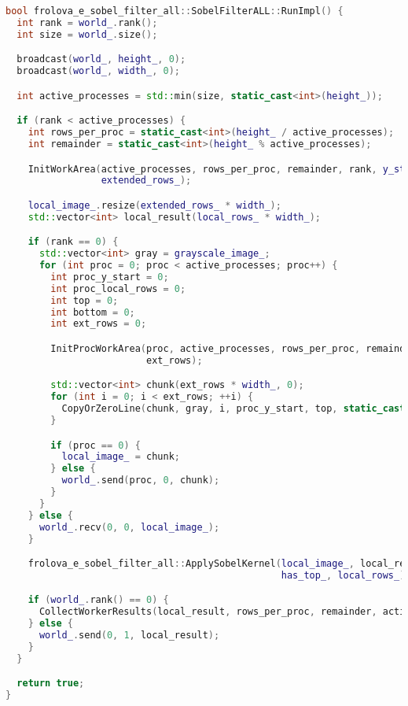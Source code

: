 \documentclass{report}
\begin{document}
\begin{lstlisting}[language=C++,caption={MPI + TBB Version}]
bool frolova_e_sobel_filter_all::SobelFilterALL::RunImpl() {
  int rank = world_.rank();
  int size = world_.size();

  broadcast(world_, height_, 0);
  broadcast(world_, width_, 0);

  int active_processes = std::min(size, static_cast<int>(height_));

  if (rank < active_processes) {
    int rows_per_proc = static_cast<int>(height_ / active_processes);
    int remainder = static_cast<int>(height_ % active_processes);

    InitWorkArea(active_processes, rows_per_proc, remainder, rank, y_start_, local_rows_, has_top_, has_bottom_,
                 extended_rows_);

    local_image_.resize(extended_rows_ * width_);
    std::vector<int> local_result(local_rows_ * width_);

    if (rank == 0) {
      std::vector<int> gray = grayscale_image_;
      for (int proc = 0; proc < active_processes; proc++) {
        int proc_y_start = 0;
        int proc_local_rows = 0;
        int top = 0;
        int bottom = 0;
        int ext_rows = 0;

        InitProcWorkArea(proc, active_processes, rows_per_proc, remainder, proc_y_start, proc_local_rows, top, bottom,
                         ext_rows);

        std::vector<int> chunk(ext_rows * width_, 0);
        for (int i = 0; i < ext_rows; ++i) {
          CopyOrZeroLine(chunk, gray, i, proc_y_start, top, static_cast<int>(width_), static_cast<int>(height_));
        }

        if (proc == 0) {
          local_image_ = chunk;
        } else {
          world_.send(proc, 0, chunk);
        }
      }
    } else {
      world_.recv(0, 0, local_image_);
    }

    frolova_e_sobel_filter_all::ApplySobelKernel(local_image_, local_result, static_cast<int>(width_), extended_rows_,
                                                 has_top_, local_rows_);

    if (world_.rank() == 0) {
      CollectWorkerResults(local_result, rows_per_proc, remainder, active_processes);
    } else {
      world_.send(0, 1, local_result);
    }
  }

  return true;
}
\end{lstlisting}
\end{document}
